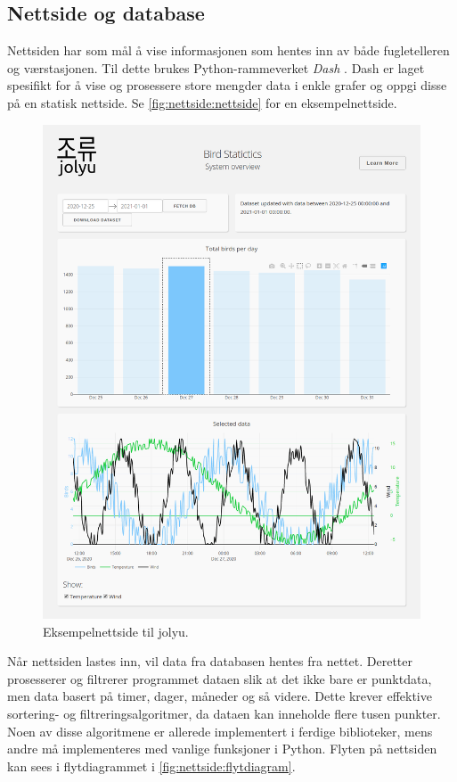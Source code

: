 \subsection{Nettside og database}\label{sec:impl:nettside}

Nettsiden har som mål å vise informasjonen som hentes inn av både fugletelleren og værstasjonen. 
Til dette brukes Python-rammeverket \textit{Dash} \cite{dash}. 
Dash er laget spesifikt for å vise og prosessere store mengder data i enkle grafer og oppgi disse på en statisk nettside. 
Se \autoref{fig:nettside:nettside}  for en eksempelnettside.

\begin{figure}[!htbp]
    \centering
    \includegraphics[width=.9\textwidth]{implementering/nettside/nettside.png}
    \caption{Eksempelnettside til jolyu.}
    \label{fig:nettside:nettside}
\end{figure}

Når nettsiden lastes inn, vil data fra databasen hentes fra nettet. 
Deretter prosesserer og filtrerer programmet dataen slik at det ikke bare er punktdata, men data basert på timer, dager, måneder og så videre. 
Dette krever effektive sortering- og filtreringsalgoritmer, da dataen kan inneholde flere tusen punkter.
Noen av disse algoritmene er allerede implementert i ferdige biblioteker, mens andre må implementeres med vanlige funksjoner i Python. 
Flyten på nettsiden kan sees i flytdiagrammet i \autoref{fig:nettside:flytdiagram}.

